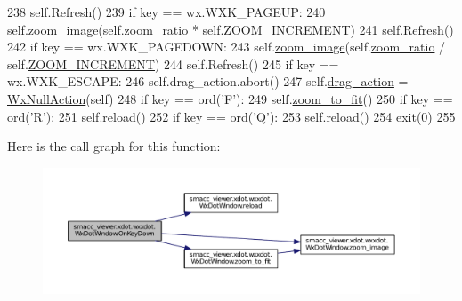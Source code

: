 \begin{DoxyCode}
238       self.Refresh()
239     \textcolor{keywordflow}{if} key == wx.WXK\_PAGEUP:
240       self.\hyperlink{classsmacc__viewer_1_1xdot_1_1wxxdot_1_1WxDotWindow_a2bf85fb763c88fed05071ebb1fad5b57}{zoom\_image}(self.\hyperlink{classsmacc__viewer_1_1xdot_1_1wxxdot_1_1WxDotWindow_ab53373bad50bdff06f2b31afa577fca2}{zoom\_ratio} * self.\hyperlink{classsmacc__viewer_1_1xdot_1_1wxxdot_1_1WxDotWindow_a392efaff1fd3a898dda28aeb26fceeb5}{ZOOM\_INCREMENT})
241       self.Refresh()
242     \textcolor{keywordflow}{if} key == wx.WXK\_PAGEDOWN:
243       self.\hyperlink{classsmacc__viewer_1_1xdot_1_1wxxdot_1_1WxDotWindow_a2bf85fb763c88fed05071ebb1fad5b57}{zoom\_image}(self.\hyperlink{classsmacc__viewer_1_1xdot_1_1wxxdot_1_1WxDotWindow_ab53373bad50bdff06f2b31afa577fca2}{zoom\_ratio} / self.\hyperlink{classsmacc__viewer_1_1xdot_1_1wxxdot_1_1WxDotWindow_a392efaff1fd3a898dda28aeb26fceeb5}{ZOOM\_INCREMENT})
244       self.Refresh()
245     \textcolor{keywordflow}{if} key == wx.WXK\_ESCAPE:
246       self.drag\_action.abort()
247       self.\hyperlink{classsmacc__viewer_1_1xdot_1_1wxxdot_1_1WxDotWindow_abc485b8edac4df3626a3c3a811a5d369}{drag\_action} = \hyperlink{classsmacc__viewer_1_1xdot_1_1wxxdot_1_1WxNullAction}{WxNullAction}(self)
248     \textcolor{keywordflow}{if} key == ord(\textcolor{stringliteral}{'F'}):
249       self.\hyperlink{classsmacc__viewer_1_1xdot_1_1wxxdot_1_1WxDotWindow_a06fdd60784dd744806e321a4d3959569}{zoom\_to\_fit}()
250     \textcolor{keywordflow}{if} key == ord(\textcolor{stringliteral}{'R'):}
251 \textcolor{stringliteral}{      self.\hyperlink{classsmacc__viewer_1_1xdot_1_1wxxdot_1_1WxDotWindow_a43e8c70e45ad00c702112ed49a7a52f3}{reload}()}
252 \textcolor{stringliteral}{    }\textcolor{keywordflow}{if} key == ord(\textcolor{stringliteral}{'Q'}):
253       self.\hyperlink{classsmacc__viewer_1_1xdot_1_1wxxdot_1_1WxDotWindow_a43e8c70e45ad00c702112ed49a7a52f3}{reload}()
254       exit(0)
255 
\end{DoxyCode}


Here is the call graph for this function\+:
\nopagebreak
\begin{figure}[H]
\begin{center}
\leavevmode
\includegraphics[width=350pt]{classsmacc__viewer_1_1xdot_1_1wxxdot_1_1WxDotWindow_af355430a6c37ee9bec65fdde2e3f1249_cgraph}
\end{center}
\end{figure}


